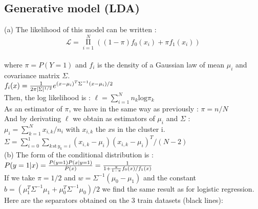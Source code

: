 \documentclass[11pt,a4paper]{article}
\begin{document}
\subsection{Generative model (LDA)}
%
%
\hspace*{-6mm}(a) The likelihood of this model can be written : 
%
$$\mathcal{L} = \mathop{\Pi}\limits_{i=1}^N ((1-\pi) f_0(x_i) + \pi f_1(x_i))$$
%
\\where $\pi = P(Y = 1)$ and $f_i$ is the density of a Gaussian law of mean $\mu_i$ and covariance matrix $\Sigma$.
\\ $f_i(x) = {1 \over 2 \pi |\Sigma|^{1/2}} e^{(x-\mu_i)^{T} \Sigma^{-1} (x-\mu_i) / 2}$
\\Then, the log likelihood is : $\ell =  \sum\limits_{i=1}^N n_k \mathrm{log} \pi_k$
\\As an estimator of $\pi$, we have in the same way as previously : $\pi = n/N$ 
\\And by derivating $\ell$ we obtain as estimators of $\mu_i$ and $\Sigma$ :
\\$\mu_i = \sum\limits_{k=1}^N x_{i,k}/n_i$ with $x_{i,k}$ the $x$s in the cluster i.
\\$\Sigma = \sum\limits_{i=0}^1 \sum\limits_{k \, \mathrm{st} \, y_k = i} (x_{i,k} - \mu_i) (x_{i,k} - \mu_i)^{T} / (N-2)$ %
%
%
\\[5mm](b) The form of the conditional distribution is :
\\$P(y=1|x) = {P(y=1) P(x|y=1) \over P(x)} = {1 \over 1+{\pi \over 1-\pi} f_0(x)/f_1(x)}$
\\If we take $\pi = 1/2$ and $w = \Sigma^{-1} (\mu_0 - \mu_1)$ and the constant
$b = (\mu_1^{T} \Sigma^{-1} \mu_1 + \mu_0^{T} \Sigma^{-1} \mu_0)/2$ we find the same result as for logistic regression.
%
%
\\[5mm] Here are the separators obtained on the 3 train datasets (black lines): 
\end{document}
